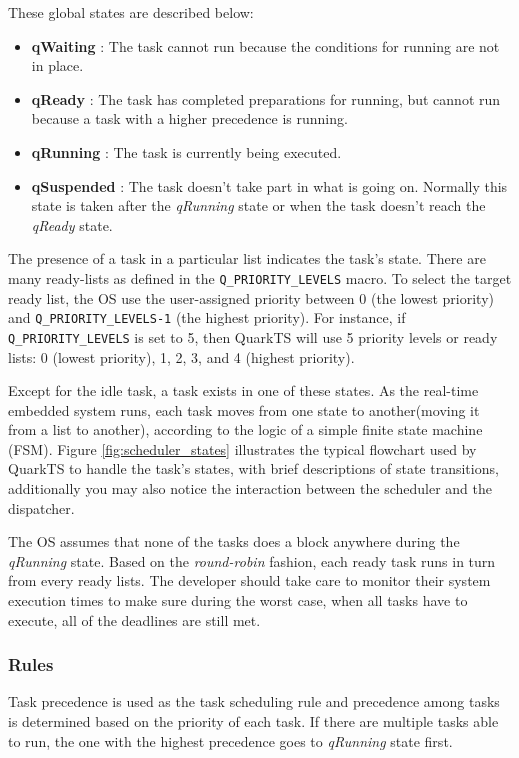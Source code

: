 \documentclass{article}
\begin{document}
These global states are described below:



\begin{itemize}
    \item \textbf{qWaiting} : The task cannot run because the conditions for running are not in place. 
    \item \textbf{qReady} : The task has completed preparations for running, but cannot run because a task with a higher precedence is running.
    \item \textbf{qRunning} : The task is currently being executed.
    \item \textbf{qSuspended} : The task doesn't take part in what is going on. Normally this state is taken after the \textit{qRunning} state or when the task doesn't reach the \textit{qReady} state.
\end{itemize}


The presence of a task in a particular list indicates the task's state. 
There are many ready-lists as defined in the \lstinline{Q_PRIORITY_LEVELS} macro.
To select the target ready list, the OS use the user-assigned priority between 0 (the lowest priority) and \lstinline{Q_PRIORITY_LEVELS-1} (the highest priority). For instance, if \lstinline{Q_PRIORITY_LEVELS} is set to 5, then QuarkTS will use 5 priority levels or ready lists: 0 (lowest priority), 1, 2, 3, and 4 (highest priority). 



Except for the idle task, a task exists in one of these states. As the real-time embedded system runs, each task moves from one state to another(moving it from a list to another), according to the logic of a simple finite state machine (FSM). Figure \ref{fig:scheduler_states} illustrates the typical flowchart used by QuarkTS to handle the task's states, with brief descriptions of state transitions, additionally you may also notice the interaction between the scheduler and the dispatcher.

The OS assumes that none of the tasks does a block anywhere during the \textit{qRunning} state. Based on the \textit{round-robin} fashion, each ready task runs in turn from every ready lists. The developer should take care to monitor their system execution times to make sure during the worst case, when all tasks have to execute, all of the deadlines are still met.


\subsubsection{Rules}
Task precedence is used as the task scheduling rule and precedence among tasks is determined based on the priority of each task. If there are multiple tasks able to run, the one with the highest precedence goes to \textit{qRunning} state first. 
\end{document}
